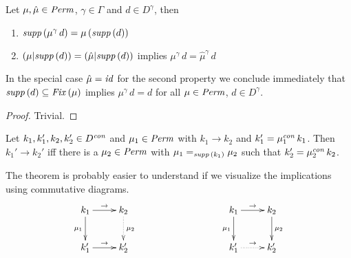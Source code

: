 \documentclass[12pt,a4paper]{report}
\newcommand{\scon}{\nstyle{con}}
\newcommand{\id}{\nstyle{id}}
\newcommand{\Fix}[1]{\nstyle{Fix}\,(#1)}
\begin{document}
\begin{lemma}[Permutations] \label{lemma:Permutations}
  Let $\mu,\hat{\mu}\in\mathit{Perm}$, $\gamma\in\Gamma$ and $d \in D^\gamma$, then
  \begin{enumerate}
    \item $\mathit{supp}\,(\mu^\gamma\,d) = \mu\,(\mathit{supp}\,(d))$
    \item $(\mu|\mathit{supp}\,(d)) = (\hat{\mu}|\mathit{supp}\,(d))$ implies $\mu^\gamma\,d = \hat{\mu}^\gamma\,d$
  \end{enumerate}
\end{lemma}
%
In the special case $\hat{\mu} = \id$ for the second property we conclude immediately that
$\supp{d} \subseteq \Fix{\mu}$ implies $\mu^\gamma\,d = d$ for all $\mu\in\mathit{Perm}$, $d\in D^\gamma$.

\begin{proof}
  Trivial.
\end{proof}

\begin{theorem} \label{theorem:small_steps_and_permutations}
  Let $k_1,k_1',k_2,k_2'\in D^\scon$ and $\mu_1\in\mathit{Perm}$ with
  $k_1 \to k_2$ and $k_1' = \mu_1^\scon\,k_1$. Then $k_1' \to k_2'$ iff there is a $\mu_2\in\mathit{Perm}$
  with $\mu_1 =_{\mathit{supp}\,(k_1)} \mu_2$ such that $k_2' = \mu_2^\scon\,k_2$.
\end{theorem}

The theorem is probably easier to understand if we visualize the implications using commutative
diagrams.
\[
  \xymatrix{
    k_1 \ar[r]^{\to} \ar[d]_{\mu_1} & k_2 \ar@{.>}[d]^{\mu_2} \\
    k_1' \ar[r]^{\to} & k_2'
  }
  \hspace*{3cm}
  \xymatrix{
    k_1 \ar[r]^{\to} \ar[d]_{\mu_1} & k_2 \ar[d]^{\mu_2} \\
    k_1' \ar@{.>}[r]^{\to} & k_2'
  }
\]
\end{document}
